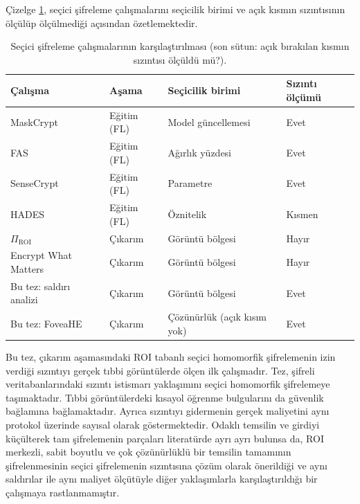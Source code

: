Çizelge \ref{tbl:literatur}, seçici şifreleme çalışmalarını seçicilik birimi ve açık kısmın sızıntısının ölçülüp ölçülmediği açısından özetlemektedir.

\begin{table}[h!]
{\setlength{\tabcolsep}{5pt}
\caption{Seçici şifreleme çalışmalarının karşılaştırılması (son sütun: açık bırakılan kısmın sızıntısı ölçüldü mü?).}
\begin{center}
\vspace{-6mm}
{\small
\begin{tabular}{llll}
\hline\hline
Çalışma & Aşama & Seçicilik birimi & Sızıntı ölçümü \\
\hline
MaskCrypt \cite{hu2025maskcrypt} & Eğitim (FL) & Model güncellemesi & Evet \\
FAS \cite{korkmaz2025fas} & Eğitim (FL) & Ağırlık yüzdesi & Evet \\
SenseCrypt \cite{li2025sensecrypt} & Eğitim (FL) & Parametre & Evet \\
HADES \cite{kaynak2026hades} & Eğitim (FL) & Öznitelik & Kısmen \\
$\Pi_{\mathrm{ROI}}$ \cite{bakas2026roi} & Çıkarım & Görüntü bölgesi & Hayır \\
Encrypt What Matters \cite{backour2026encrypt} & Çıkarım & Görüntü bölgesi & Hayır \\
Bu tez: saldırı analizi & Çıkarım & Görüntü bölgesi & Evet \\
Bu tez: FoveaHE & Çıkarım & Çözünürlük (açık kısım yok) & Evet \\
\hline
\end{tabular}}
\vspace{-6mm}
\end{center}
\label{tbl:literatur}}
\end{table}

Bu tez, çıkarım aşamasındaki ROI tabanlı seçici homomorfik şifrelemenin izin verdiği sızıntıyı gerçek tıbbi görüntülerde ölçen ilk çalışmadır. Tez, şifreli veritabanlarındaki sızıntı istismarı yaklaşımını seçici homomorfik şifrelemeye taşımaktadır. Tıbbi görüntülerdeki kısayol öğrenme bulgularını da güvenlik bağlamına bağlamaktadır. Ayrıca sızıntıyı gidermenin gerçek maliyetini aynı protokol üzerinde sayısal olarak göstermektedir. Odaklı temsilin ve girdiyi küçülterek tam şifrelemenin parçaları literatürde ayrı ayrı bulunsa da, ROI merkezli, sabit boyutlu ve çok çözünürlüklü bir temsilin tamamının şifrelenmesinin seçici şifrelemenin sızıntısına çözüm olarak önerildiği ve aynı saldırılar ile aynı maliyet ölçütüyle diğer yaklaşımlarla karşılaştırıldığı bir çalışmaya rastlanmamıştır.

